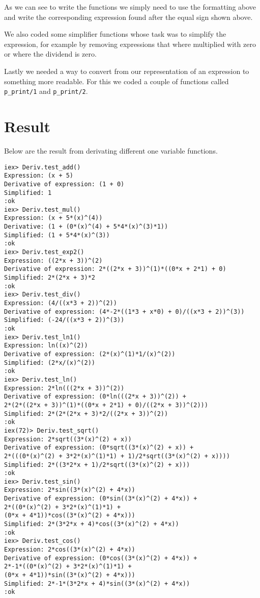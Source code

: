 \documentclass[a4paper,11pt]{article}
\newenvironment{code}{\captionsetup{type=listing}}{}
\begin{document}
As we can see to write the functions we simply need to use the formatting above and write the corresponding expression 
found after the equal sign shown above.

We also coded some simplifier functions whose task was to simplify the expression, for example by removing expressions 
that where multiplied with zero or where the dividend is zero. 

Lastly we needed a way to convert from our representation of an expression to something more readable. For this we coded a 
couple of functions called {\tt p\_print/1} and {\tt p\_print/2}.

\section*{Result}
Below are the result from derivating different one variable functions.
\begin{code}
\begin{verbatim}
iex> Deriv.test_add()
Expression: (x + 5)
Derivative of expression: (1 + 0)
Simplified: 1
:ok
iex> Deriv.test_mul()
Expression: (x + 5*(x)^(4))
Derivative: (1 + (0*(x)^(4) + 5*4*(x)^(3)*1))
Simplified: (1 + 5*4*(x)^(3))
:ok
iex> Deriv.test_exp2()
Expression: ((2*x + 3))^(2)
Derivative of expression: 2*((2*x + 3))^(1)*((0*x + 2*1) + 0)
Simplified: 2*(2*x + 3)*2
:ok
iex> Deriv.test_div()      
Expression: (4/((x*3 + 2))^(2))
Derivative of expression: (4*-2*((1*3 + x*0) + 0)/((x*3 + 2))^(3))
Simplified: (-24/((x*3 + 2))^(3))
:ok
iex> Deriv.test_ln1()
Expression: ln((x)^(2))
Derivative of expression: (2*(x)^(1)*1/(x)^(2))
Simplified: (2*x/(x)^(2))
:ok
iex> Deriv.test_ln() 
Expression: 2*ln(((2*x + 3))^(2))
Derivative of expression: (0*ln(((2*x + 3))^(2)) + 
2*(2*((2*x + 3))^(1)*((0*x + 2*1) + 0)/((2*x + 3))^(2)))
Simplified: 2*(2*(2*x + 3)*2/((2*x + 3))^(2))
:ok
iex(72)> Deriv.test_sqrt()
Expression: 2*sqrt((3*(x)^(2) + x))
Derivative of expression: (0*sqrt((3*(x)^(2) + x)) + 
2*(((0*(x)^(2) + 3*2*(x)^(1)*1) + 1)/2*sqrt((3*(x)^(2) + x))))
Simplified: 2*((3*2*x + 1)/2*sqrt((3*(x)^(2) + x)))
:ok
iex> Deriv.test_sin() 
Expression: 2*sin((3*(x)^(2) + 4*x))
Derivative of expression: (0*sin((3*(x)^(2) + 4*x)) + 
2*((0*(x)^(2) + 3*2*(x)^(1)*1) + 
(0*x + 4*1))*cos((3*(x)^(2) + 4*x)))
Simplified: 2*(3*2*x + 4)*cos((3*(x)^(2) + 4*x))
:ok
iex> Deriv.test_cos() 
Expression: 2*cos((3*(x)^(2) + 4*x))
Derivative of expression: (0*cos((3*(x)^(2) + 4*x)) + 
2*-1*((0*(x)^(2) + 3*2*(x)^(1)*1) + 
(0*x + 4*1))*sin((3*(x)^(2) + 4*x)))
Simplified: 2*-1*(3*2*x + 4)*sin((3*(x)^(2) + 4*x))
:ok   
\end{verbatim}
\end{code}
\end{document}
